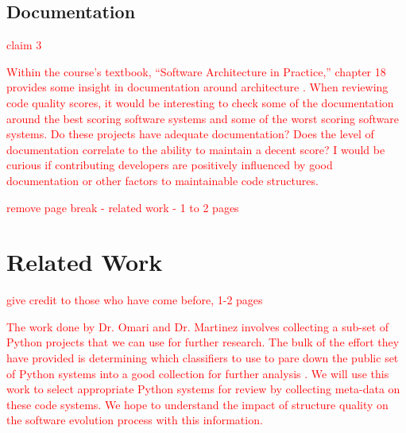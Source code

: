 \documentclass[12pt,conference]{IEEEtran}
\newcommand\todo[1]{\textcolor{red}{#1}}
\begin{document}
\subsection{Documentation} \label{sectionDocumentation}


\todo{claim 3}

\todo{Within the course's textbook, ``Software Architecture in Practice,'' chapter 18 provides some insight in documentation around architecture \cite{book:software-architecture-in-practice}. When reviewing code quality scores, it would be interesting to check some of the documentation around the best scoring software systems and some of the worst scoring software systems. Do these projects have adequate documentation? Does the level of documentation correlate to the ability to maintain a decent score? I would be curious if contributing developers are positively influenced by good documentation or other factors to maintainable code structures.}

\newpage \todo{remove page break - related work - 1 to 2 pages}

\section{Related Work}

\todo{give credit to those who have come before, 1-2 pages}

\todo{The work done by Dr. Omari and Dr. Martinez involves collecting a sub-set of Python projects that we can use for further research. The bulk of the effort they have provided is determining which classifiers to use to pare down the public set of Python systems into a good collection for further analysis \cite{omari:2018}. We will use this work to select appropriate Python systems for review by collecting meta-data on these code systems. We hope to understand the impact of structure quality on the software evolution process with this information.}
\end{document}
